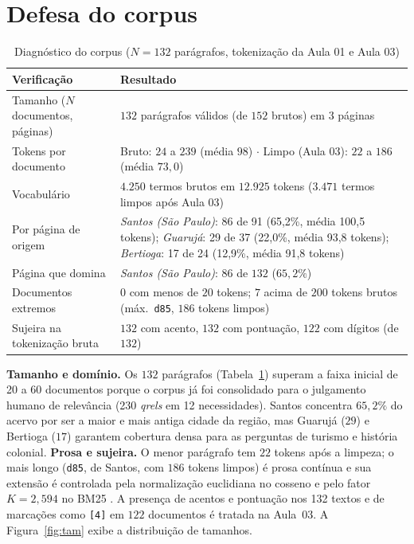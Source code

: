 \documentclass[
  article,
  12pt,
  oneside,
  a4paper,
  english,
  brazil
]{abntex2}\usepackage[]{graphicx}\usepackage[]{xcolor}
\begin{document}
\section{Defesa do corpus}

\begin{table}[htb]
  \centering
  \caption{Diagnóstico do corpus ($N = 132$ parágrafos, tokenização da Aula 01 e Aula 03)}
  \label{tab:diag}
  \small
  \begin{tabular}{@{}p{}p{}@{}}
    \toprule
    \textbf{Verificação} & \textbf{Resultado} \\
    \midrule
    Tamanho ($N$ documentos, páginas) & $132$ parágrafos válidos (de $152$ brutos) em $3$ páginas \\
    Tokens por documento & Bruto: $24$ a $239$ (média $98$) $\cdot$ Limpo (Aula 03): $22$ a $186$ (média $73,0$) \\
    Vocabulário & $4.250$ termos brutos em $12.925$ tokens ($3.471$ termos limpos após Aula 03) \\
    Por página de origem & \textit{Santos (S\~ao Paulo)}: 86 de 91 (65,2\%, m\'edia 100,5 tokens); \textit{Guaruj\'a}: 29 de 37 (22,0\%, m\'edia 93,8 tokens); \textit{Bertioga}: 17 de 24 (12,9\%, m\'edia 91,8 tokens) \\
    Página que domina & \textit{Santos (São Paulo)}: $86$ de $132$ ($65,2\%$) \\
    Documentos extremos & $0$ com menos de $20$ tokens; $7$ acima de $200$ tokens brutos (máx.\ \texttt{d85}, $186$ tokens limpos) \\
    Sujeira na tokenização bruta & $132$ com acento, $132$ com pontuação, $122$ com dígitos (de $132$) \\
    \bottomrule
  \end{tabular}
\end{table}

\textbf{Tamanho e domínio.} Os $132$ parágrafos
(Tabela~\ref{tab:diag}) superam a faixa inicial de 20 a 60 documentos porque o
corpus já foi consolidado para o julgamento humano de relevância (230
\textit{qrels} em 12 necessidades). Santos concentra
$65,2\%$ do acervo por ser a maior e mais antiga
cidade da região, mas Guarujá ($29$) e Bertioga ($17$) garantem cobertura densa
para as perguntas de turismo e história colonial.
\textbf{Prosa e sujeira.} O menor parágrafo tem
$22$ tokens após a limpeza; o mais longo
(\texttt{d85}, de Santos, com
$186$ tokens limpos) é prosa contínua e sua extensão é
controlada pela normalização euclidiana no cosseno e pelo fator
$K = 2,594$ no BM25 \cite{robertson2009}. A presença de acentos e pontuação nos 132 textos e
de marcações como \texttt{[4]} em $122$ documentos é
tratada na Aula~03. A Figura~\ref{fig:tam} exibe a distribuição de tamanhos.
\end{document}
